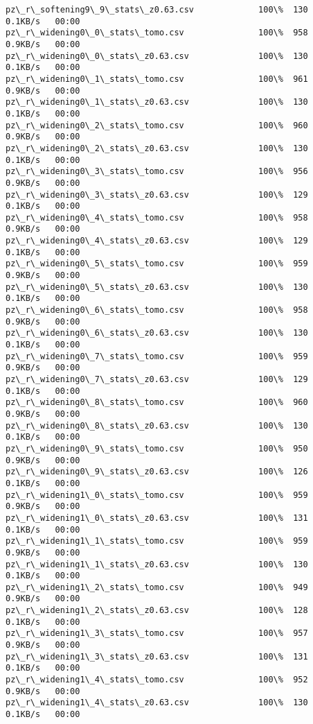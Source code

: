 \documentclass[11pt]{article}
\begin{document}
\begin{Verbatim}[commandchars=\\\{\}]
pz\_r\_softening9\_9\_stats\_z0.63.csv             100\%  130     0.1KB/s   00:00    
pz\_r\_widening0\_0\_stats\_tomo.csv               100\%  958     0.9KB/s   00:00    
pz\_r\_widening0\_0\_stats\_z0.63.csv              100\%  130     0.1KB/s   00:00    
pz\_r\_widening0\_1\_stats\_tomo.csv               100\%  961     0.9KB/s   00:00    
pz\_r\_widening0\_1\_stats\_z0.63.csv              100\%  130     0.1KB/s   00:00    
pz\_r\_widening0\_2\_stats\_tomo.csv               100\%  960     0.9KB/s   00:00    
pz\_r\_widening0\_2\_stats\_z0.63.csv              100\%  130     0.1KB/s   00:00    
pz\_r\_widening0\_3\_stats\_tomo.csv               100\%  956     0.9KB/s   00:00    
pz\_r\_widening0\_3\_stats\_z0.63.csv              100\%  129     0.1KB/s   00:00    
pz\_r\_widening0\_4\_stats\_tomo.csv               100\%  958     0.9KB/s   00:00    
pz\_r\_widening0\_4\_stats\_z0.63.csv              100\%  129     0.1KB/s   00:00    
pz\_r\_widening0\_5\_stats\_tomo.csv               100\%  959     0.9KB/s   00:00    
pz\_r\_widening0\_5\_stats\_z0.63.csv              100\%  130     0.1KB/s   00:00    
pz\_r\_widening0\_6\_stats\_tomo.csv               100\%  958     0.9KB/s   00:00    
pz\_r\_widening0\_6\_stats\_z0.63.csv              100\%  130     0.1KB/s   00:00    
pz\_r\_widening0\_7\_stats\_tomo.csv               100\%  959     0.9KB/s   00:00    
pz\_r\_widening0\_7\_stats\_z0.63.csv              100\%  129     0.1KB/s   00:00    
pz\_r\_widening0\_8\_stats\_tomo.csv               100\%  960     0.9KB/s   00:00    
pz\_r\_widening0\_8\_stats\_z0.63.csv              100\%  130     0.1KB/s   00:00    
pz\_r\_widening0\_9\_stats\_tomo.csv               100\%  950     0.9KB/s   00:00    
pz\_r\_widening0\_9\_stats\_z0.63.csv              100\%  126     0.1KB/s   00:00    
pz\_r\_widening1\_0\_stats\_tomo.csv               100\%  959     0.9KB/s   00:00    
pz\_r\_widening1\_0\_stats\_z0.63.csv              100\%  131     0.1KB/s   00:00    
pz\_r\_widening1\_1\_stats\_tomo.csv               100\%  959     0.9KB/s   00:00    
pz\_r\_widening1\_1\_stats\_z0.63.csv              100\%  130     0.1KB/s   00:00    
pz\_r\_widening1\_2\_stats\_tomo.csv               100\%  949     0.9KB/s   00:00    
pz\_r\_widening1\_2\_stats\_z0.63.csv              100\%  128     0.1KB/s   00:00    
pz\_r\_widening1\_3\_stats\_tomo.csv               100\%  957     0.9KB/s   00:00    
pz\_r\_widening1\_3\_stats\_z0.63.csv              100\%  131     0.1KB/s   00:00    
pz\_r\_widening1\_4\_stats\_tomo.csv               100\%  952     0.9KB/s   00:00    
pz\_r\_widening1\_4\_stats\_z0.63.csv              100\%  130     0.1KB/s   00:00    

\end{Verbatim}
\end{document}
